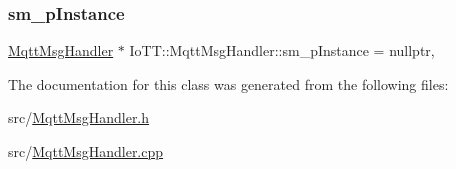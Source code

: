 \mbox{\label{classIoTT_1_1MqttMsgHandler_a16f295286a833a7c905a126db6a60118}} 
\subsubsection{\texorpdfstring{sm\+\_\+p\+Instance}{sm\_pInstance}}
{\footnotesize\ttfamily \hyperlink{classIoTT_1_1MqttMsgHandler}{Mqtt\+Msg\+Handler} $\ast$ Io\+T\+T\+::\+Mqtt\+Msg\+Handler\+::sm\+\_\+p\+Instance = nullptr\hspace{0.3cm}{\ttfamily [static]}, {\ttfamily [private]}}



The documentation for this class was generated from the following files\+:\begin{DoxyCompactItemize}
\item 
src/\hyperlink{MqttMsgHandler_8h}{Mqtt\+Msg\+Handler.\+h}\item 
src/\hyperlink{MqttMsgHandler_8cpp}{Mqtt\+Msg\+Handler.\+cpp}\end{DoxyCompactItemize}
